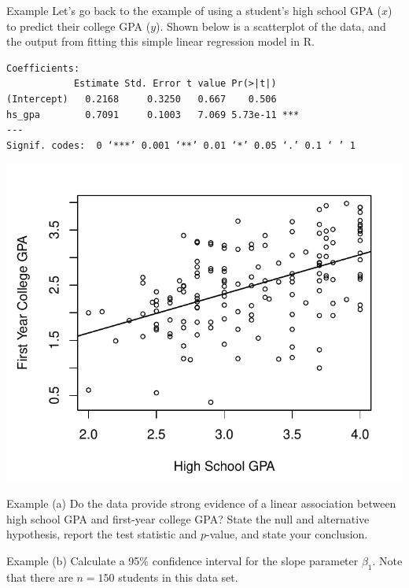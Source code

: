 \documentclass[11pt]{beamer}\usepackage[]{graphicx}\usepackage[]{color}
\begin{document}
\begin{frame}[fragile]{Example}
Let's go back to the example of using a student's high school GPA ($x$) to predict their college GPA ($y$).  Shown below is a scatterplot of the data, and the output from fitting this simple linear regression model in R.

\scriptsize
\begin{verbatim}
Coefficients:
            Estimate Std. Error t value Pr(>|t|)    
(Intercept)   0.2168     0.3250   0.667    0.506    
hs_gpa        0.7091     0.1003   7.069 5.73e-11 ***
---
Signif. codes:  0 ‘***’ 0.001 ‘**’ 0.01 ‘*’ 0.05 ‘.’ 0.1 ‘ ’ 1
\end{verbatim}

\includegraphics[scale=0.3]{figure/gpa_scatter_line.pdf}
\end{frame}

\begin{frame}{Example}
(a) Do the data provide strong evidence of a linear association between high school GPA and first-year college GPA?  State the null and alternative hypothesis, report the test statistic and $p$-value, and state your conclusion.
\vspace{5cm}
\end{frame}

\begin{frame}{Example}
(b) Calculate a 95\% confidence interval for the slope parameter $\beta_1$.  Note that there are $n=150$ students in this data set.
\vspace{6cm}
\end{frame}
\end{document}

